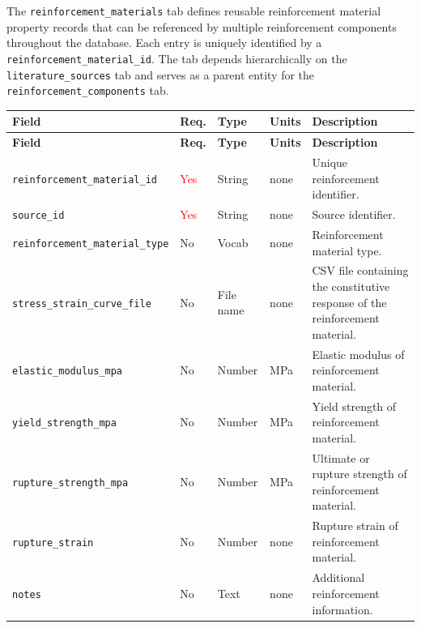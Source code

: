 \documentclass[11pt]{book}
\begin{document}
The \texttt{reinforcement\_materials} tab defines reusable reinforcement material property records that can be referenced by multiple reinforcement components throughout the database. Each entry is uniquely identified by a \texttt{reinforcement\_material\_id}. The tab depends hierarchically on the \texttt{literature\_sources} tab and serves as a parent entity for the \texttt{reinforcement\_components} tab. 


\begin{longtable}{p{}p{}p{}p{}p{}}

\hline
\textbf{Field} &
\textbf{Req.} &
\textbf{Type} &
\textbf{Units} &
\textbf{Description} \\
\hline
\endfirsthead

\hline
\textbf{Field} &
\textbf{Req.} &
\textbf{Type} &
\textbf{Units} &
\textbf{Description} \\
\hline
\endhead

\texttt{reinforcement\_material\_id} &
\textcolor{red}{Yes} &
String &
none &
Unique reinforcement identifier. \\

\texttt{source\_id} &
\textcolor{red}{Yes} &
String &
none &
Source identifier. \\

\texttt{reinforcement\_material\_type} &
No &
Vocab &
none &
Reinforcement material type. \\

\texttt{stress\_strain\_curve\_file} &
No &
File name &
none &
CSV file containing the constitutive response of the reinforcement material. \\

\texttt{elastic\_modulus\_mpa} &
No &
Number &
MPa &
Elastic modulus of reinforcement material. \\

\texttt{yield\_strength\_mpa} &
No &
Number &
MPa &
Yield strength of reinforcement material. \\

\texttt{rupture\_strength\_mpa} &
No &
Number &
MPa &
Ultimate or rupture strength of reinforcement material. \\

\texttt{rupture\_strain} &
No &
Number &
none &
Rupture strain of reinforcement material. \\

\texttt{notes} &
No &
Text &
none &
Additional reinforcement information. \\

\hline

\end{longtable}
\end{document}
